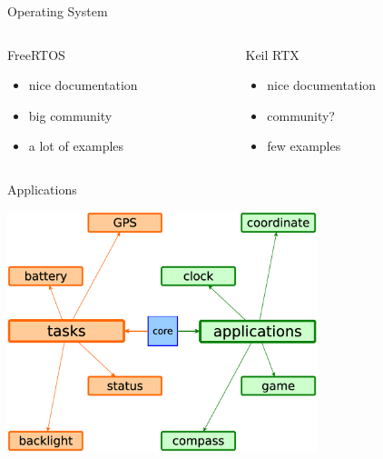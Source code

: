 \documentclass[compress,red]{beamer}
\begin{document}
\begin{frame}{Operating System}
  \Large
  \begin{columns}[T] %
    \begin{column}{.48\textwidth}
      FreeRTOS
      \vskip 1cm
      \begin{itemize}
      \item nice documentation
        \vskip 1cm
      \item big community
        \vskip 1cm
      \item a lot of examples
      \end{itemize}
    \end{column}
    \hfill%
    \begin{column}{.48\textwidth}
      Keil RTX
      \vskip 1cm
      \begin{itemize}
      \item nice documentation
        \vskip 1cm
      \item community?
        \vskip 1cm
      \item few examples
      \end{itemize}
    \end{column}%
  \end{columns}

\end{frame}


\begin{frame}{Applications}
  \begin{center}
    \includegraphics[height=7cm]{sw-app.eps}
  \end{center}

\end{frame}
\end{document}
